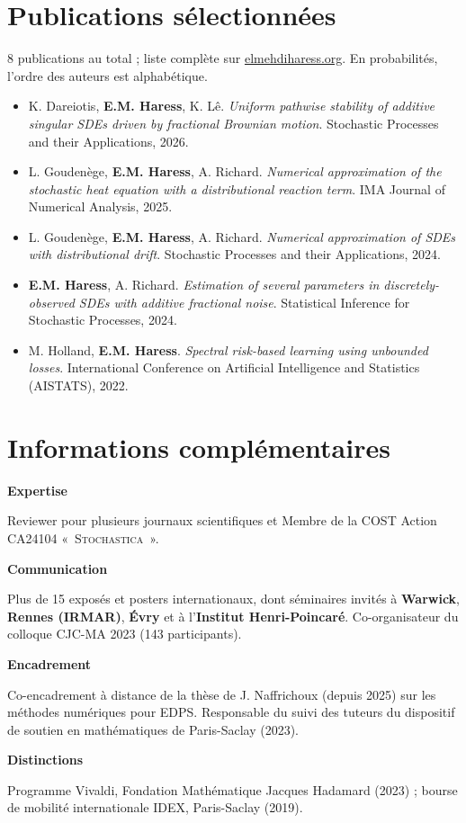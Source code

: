 \documentclass[10pt,a4paper]{article}
\newlength{\datecol}\setlength{\datecol}{0.165\textwidth}
\newlength{\gutter}\setlength{\gutter}{1em}
\newlength{\bodycol}
\newcommand{\skillrow}[2]{%
  \par\noindent
  \begin{minipage}[t]{\datecol}
    \vspace{0pt}\raggedright{\headingfont\bfseries\footnotesize #1}
  \end{minipage}%
  \hspace{\gutter}%
  \begin{minipage}[t]{\bodycol}
    \vspace{0pt}\raggedright\small #2
  \end{minipage}%
  \par\vspace{0.7ex}
}
\begin{document}
\section{Publications sélectionnées}
{\footnotesize\color{muted}8 publications au total ; liste complète sur \href{https://elmehdiharess.org}{elmehdiharess.org}.
En probabilités, l'ordre des auteurs est alphabétique.\par}
\vspace{0.6ex}
\begin{itemize}[leftmargin=1.3em, itemsep=0.35ex, topsep=0pt, label={\textcolor{accent}{\scriptsize$\blacktriangleright$}}]
  \footnotesize
  \item K. Dareiotis, \textbf{E.M. Haress}, K. Lê. \emph{Uniform pathwise stability of additive singular SDEs
  driven by fractional Brownian motion}. Stochastic Processes and their Applications, 2026.
  \item L. Goudenège, \textbf{E.M. Haress}, A. Richard. \emph{Numerical approximation of the stochastic heat
  equation with a distributional reaction term}. IMA Journal of Numerical Analysis, 2025.
  \item L. Goudenège, \textbf{E.M. Haress}, A. Richard. \emph{Numerical approximation of SDEs with
  distributional drift}. Stochastic Processes and their Applications, 2024.
  \item \textbf{E.M. Haress}, A. Richard. \emph{Estimation of several parameters in discretely-observed SDEs
  with additive fractional noise}. Statistical Inference for Stochastic Processes, 2024.
  \item M. Holland, \textbf{E.M. Haress}. \emph{Spectral risk-based learning using unbounded losses}.
  International Conference on Artificial Intelligence and Statistics (AISTATS), 2022.
\end{itemize}

\section{Informations complémentaires}
\skillrow{Expertise}{Reviewer pour plusieurs journaux scientifiques et Membre de la COST Action CA24104
«~\textsc{Stochastica}~».}
\skillrow{Communication}{Plus de 15 exposés et posters internationaux, dont séminaires invités à
\textbf{Warwick}, \textbf{Rennes (IRMAR)}, \textbf{Évry} et à l'\textbf{Institut Henri-Poincaré}.
Co-organisateur du colloque CJC-MA 2023 (143 participants).}
\skillrow{Encadrement}{Co-encadrement à distance de la thèse de J. Naffrichoux (depuis 2025) sur les méthodes
numériques pour EDPS. Responsable du suivi des tuteurs du dispositif de soutien en mathématiques de
Paris-Saclay (2023).}
\skillrow{Distinctions}{Programme Vivaldi, Fondation Mathématique Jacques Hadamard (2023) ; bourse de
mobilité internationale IDEX, Paris-Saclay (2019).}
\end{document}
